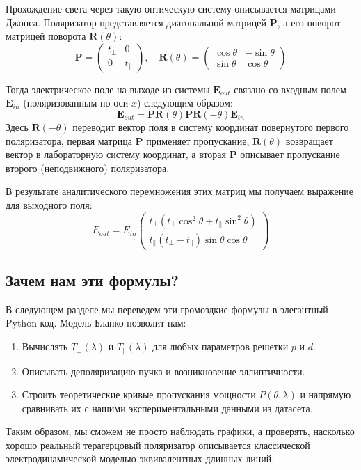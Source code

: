 
Прохождение света через такую оптическую систему описывается матрицами Джонса. Поляризатор представляется диагональной матрицей $\mathbf{P}$, а его поворот~--- матрицей поворота $\mathbf{R}(\theta)$:
\begin{equation}
\mathbf{P} = \begin{pmatrix} t_\perp & 0 \\ 0 & t_\parallel \end{pmatrix}, \quad \mathbf{R}(\theta) = \begin{pmatrix} \cos\theta & -\sin\theta \\ \sin\theta & \cos\theta \end{pmatrix}
\end{equation}


Тогда электрическое поле на выходе из системы $\mathbf{E}_{out}$ связано со входным полем $\mathbf{E}_{in}$ (поляризованным по оси $x$) следующим образом:
\begin{equation}\label{eq:jones_system}
\mathbf{E}_{out} = \mathbf{P} \mathbf{R}(\theta) \mathbf{P} \mathbf{R}(-\theta) \mathbf{E}_{in}
\end{equation}
Здесь $\mathbf{R}(-\theta)$ переводит вектор поля в систему координат повернутого первого поляризатора, первая матрица $\mathbf{P}$ применяет пропускание, $\mathbf{R}(\theta)$ возвращает вектор в лабораторную систему координат, а вторая $\mathbf{P}$ описывает пропускание второго (неподвижного) поляризатора.

В результате аналитического перемножения этих матриц мы получаем выражение для выходного поля:
\begin{equation}
E_{out} = E_{in} \begin{pmatrix} t_\perp(t_\perp \cos^2\theta + t_\parallel \sin^2\theta) \\ t_\parallel(t_\perp - t_\parallel)\sin\theta\cos\theta \end{pmatrix}
\end{equation}

\subsection{Зачем нам эти формулы?}
В следующем разделе мы переведем эти громоздкие формулы в элегантный Python-код. Модель Бланко позволит нам:
\begin{enumerate}
    \item Вычислять $T_\perp(\lambda)$ и $T_\parallel(\lambda)$ для любых параметров решетки $p$ и $d$.
    \item Описывать деполяризацию пучка и возникновение эллиптичности.
    \item Строить теоретические кривые пропускания мощности $P(\theta, \lambda)$ и напрямую сравнивать их с нашими экспериментальными данными из датасета.
\end{enumerate}

Таким образом, мы сможем не просто наблюдать графики, а проверять, насколько хорошо реальный терагерцовый поляризатор описывается классической электродинамической моделью эквивалентных длинных линий.
